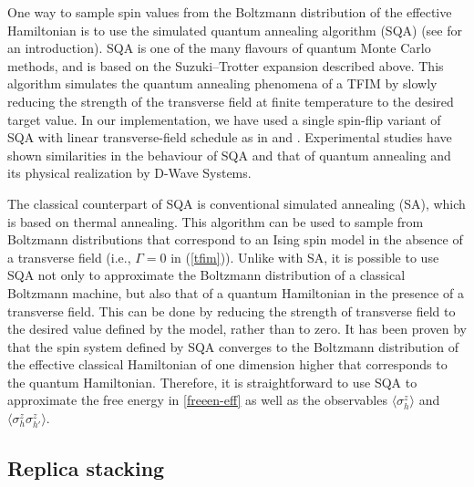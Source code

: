 \documentclass[pra,twocolumn,floatfix,superscriptaddress]{revtex4}
\begin{document}
One way to sample spin values from the Boltzmann distribution of the effective Hamiltonian is to use the simulated quantum annealing algorithm (SQA) (see \cite[p. 422]{naturalcomputingalgorithms} for an introduction). SQA is one of the many flavours of quantum Monte Carlo methods, and is based on the Suzuki--Trotter expansion described above. This algorithm simulates the quantum annealing phenomena of a TFIM by slowly reducing the strength of the transverse field at finite temperature to the desired target value. 
In our implementation, we have used a single spin-flip variant of SQA with linear transverse-field schedule as in \cite{martovnak2002quantum} and \cite{1411.5693}. Experimental studies have shown similarities in the behaviour of SQA and that of quantum annealing \cite{1510.08057, 2014arXiv1409.3827A} and its physical realization \cite{arXiv:1509.02562v2, arXiv:1401.7087v2} by D-Wave Systems. 

The classical counterpart of SQA is conventional simulated annealing (SA), which is based on thermal annealing. This algorithm can be used to sample from Boltzmann distributions that correspond to an Ising spin model in the absence of a transverse field (i.e., $\Gamma = 0$ in (\ref{tfim})). Unlike with SA, it is possible to use SQA not only to approximate the Boltzmann distribution of a classical Boltzmann machine, but also that of a quantum Hamiltonian in the presence of a transverse field. This can be done by reducing the strength of transverse field to the desired value defined by the model, rather than to zero.  It has been proven by  \cite{morita2006convergence} that the spin system defined by SQA converges to the Boltzmann distribution of the effective classical Hamiltonian of one dimension higher that corresponds to the quantum Hamiltonian. Therefore, it is straightforward to use SQA to approximate the free energy in \eqref{freeen-eff} as well as the observables $\langle\sigma_h^z\rangle$ and $\langle \sigma_h^z \sigma_{h'}^z \rangle$.       

\subsection{Replica stacking}\label{sec:stacking}
\end{document}
